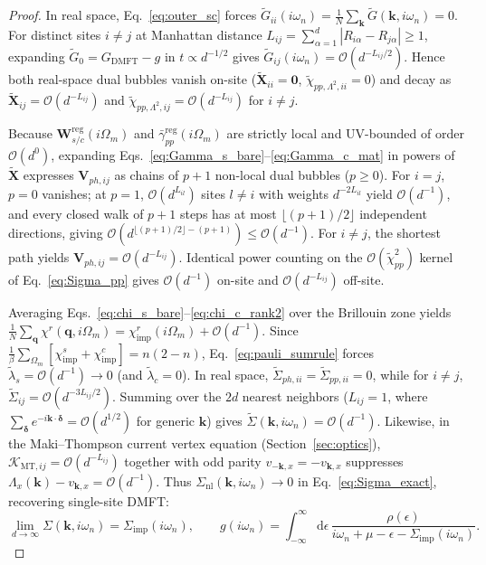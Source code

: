 \documentclass[11pt,a4paper]{article}
\numberwithin{equation}{section}
\theoremstyle{plain}
\theoremstyle{definition}
\providecommand{\vk}{\mathbf{k}}
\providecommand{\vq}{\mathbf{q}}
\providecommand{\dd}{\mathrm{d}}
\begin{document}
\begin{proof}
In real space, Eq.~\eqref{eq:outer_sc} forces
$\tilde{G}_{ii}(i\omega_n) = \frac{1}{N}\sum_{\vk}\tilde{G}(\vk,i\omega_n) = 0$. For
distinct sites $i \neq j$ at Manhattan distance
$L_{ij} = \sum_{\alpha=1}^d |R_{i\alpha} - R_{j\alpha}| \ge 1$, expanding
$\tilde{G}_0 = G_{\mathrm{DMFT}} - g$ in $t \propto d^{-1/2}$ gives
$\tilde{G}_{ij}(i\omega_n) = \mathcal{O}(d^{-L_{ij}/2})$. Hence both real-space dual
bubbles vanish on-site ($\tilde{\mathbf{X}}_{ii} = \mathbf{0}$,
$\tilde{\chi}_{pp,\Lambda^2, ii} = 0$) and decay as
$\tilde{\mathbf{X}}_{ij} = \mathcal{O}(d^{-L_{ij}})$ and
$\tilde{\chi}_{pp,\Lambda^2, ij} = \mathcal{O}(d^{-L_{ij}})$ for $i \neq j$.

Because $\mathbf{W}_{s/c}^{\mathrm{reg}}(i\Omega_m)$ and
$\bar{\gamma}_{pp}^{\mathrm{reg}}(i\Omega_m)$ are strictly local and UV-bounded of order
$\mathcal{O}(d^0)$, expanding Eqs.~\eqref{eq:Gamma_s_bare}--\eqref{eq:Gamma_c_mat} in
powers of $\tilde{\mathbf{X}}$ expresses $\mathbf{V}_{ph,ij}$ as chains of $p+1$
non-local dual bubbles ($p \ge 0$). For $i = j$, $p = 0$ vanishes; at $p = 1$,
$\mathcal{O}(d^{L_{il}})$ sites $l \neq i$ with weights $d^{-2L_{il}}$ yield
$\mathcal{O}(d^{-1})$, and every closed walk of $p+1$ steps has at most
$\lfloor(p+1)/2\rfloor$ independent directions, giving
$\mathcal{O}(d^{\lfloor(p+1)/2\rfloor - (p+1)}) \le \mathcal{O}(d^{-1})$. For $i \neq j$,
the shortest path yields $\mathbf{V}_{ph,ij} = \mathcal{O}(d^{-L_{ij}})$. Identical
power counting on the $\mathcal{O}(\tilde{\chi}_{pp}^2)$ kernel of Eq.~\eqref{eq:Sigma_pp}
gives $\mathcal{O}(d^{-1})$ on-site and $\mathcal{O}(d^{-L_{ij}})$ off-site.

Averaging Eqs.~\eqref{eq:chi_s_bare}--\eqref{eq:chi_c_rank2} over the Brillouin zone
yields $\frac{1}{N}\sum_{\vq}\chi^r(\vq,i\Omega_m) = \chi_{\mathrm{imp}}^r(i\Omega_m) + \mathcal{O}(d^{-1})$.
Since $\frac{1}{\beta}\sum_{\Omega_m}[\chi_{\mathrm{imp}}^s + \chi_{\mathrm{imp}}^c] = n(2-n)$,
Eq.~\eqref{eq:pauli_sumrule} forces $\tilde{\lambda}_s = \mathcal{O}(d^{-1}) \to 0$
(and $\tilde{\lambda}_c = 0$). In real space, $\tilde{\Sigma}_{ph,ii} = \tilde{\Sigma}_{pp,ii} = 0$,
while for $i \neq j$, $\tilde{\Sigma}_{ij} = \mathcal{O}(d^{-3L_{ij}/2})$. Summing over
the $2d$ nearest neighbors ($L_{ij} = 1$, where
$\sum_{\boldsymbol{\delta}} e^{-i\vk\cdot\boldsymbol{\delta}} = \mathcal{O}(d^{1/2})$
for generic $\vk$) gives $\tilde{\Sigma}(\vk,i\omega_n) = \mathcal{O}(d^{-1})$. Likewise,
in the Maki--Thompson current vertex equation (Section~\ref{sec:optics}),
$\mathcal{K}_{\mathrm{MT},ij} = \mathcal{O}(d^{-L_{ij}})$ together with odd parity
$v_{-\vk,x} = -v_{\vk,x}$ suppresses $\Lambda_x(\vk) - v_{\vk,x} = \mathcal{O}(d^{-1})$.
Thus $\Sigma_{\mathrm{nl}}(\vk,i\omega_n) \to 0$ in Eq.~\eqref{eq:Sigma_exact},
recovering single-site DMFT:
\begin{equation}
    \lim_{d\to\infty}\Sigma(\vk,i\omega_n) = \Sigma_{\mathrm{imp}}(i\omega_n),
    \qquad
    g(i\omega_n) = \int_{-\infty}^{\infty} \dd\epsilon\,
        \frac{\rho(\epsilon)}{i\omega_n + \mu - \epsilon - \Sigma_{\mathrm{imp}}(i\omega_n)}.
\end{equation}
\end{proof}
\end{document}
